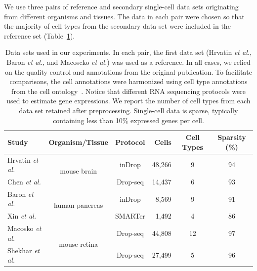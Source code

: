 \documentclass[runningheads]{llncs}
\newcommand{\etal}{\textit{et al.}}
\begin{document}
We use three pairs of reference and secondary single-cell data sets originating
from different organisms and tissues. The data in each pair were chosen so that
the majority of cell types from the secondary data set were included in the
reference set (Table~\ref{tab:datasets}).

\begin{table}[ht]
\begin{center}
\setlength\tabcolsep{4pt}
\begin{tabular}{l c c r c c}
\toprule
Study & Organism/Tissue & Protocol & Cells & Cell Types & Sparsity (\%) \\
\midrule
Hrvatin \etal & \multirow{2}{*}{mouse brain} & inDrop & 48,266 & 9 & 94 \\
Chen \etal & & Drop-seq & 14,437 & 6 & 93 \\[5pt]
Baron \etal & \multirow{2}{*}{human pancreas} & inDrop & 8,569 & 9 & 91 \\
Xin \etal & & SMARTer & 1,492 & 4 & 86 \\[5pt]
Macosko \etal & \multirow{2}{*}{mouse retina} & Drop-seq & 44,808 & 12 & 97 \\
Shekhar \etal & & Drop-seq & 27,499 & 5 & 96 \\
\bottomrule
\end{tabular}
\end{center}
\caption{Data sets used in our experiments. In each pair, the first data set
(Hrvatin \etal, Baron \etal, and Macoscko \etal) was used as a reference. In
all cases, we relied on the quality control and annotations from the original
publication. To facilitate comparisons, the cell annotations were harmonized using
cell type annotations from the cell ontology~\cite{cell_ontology}. Notice that
different RNA sequencing protocols were used to estimate gene expressions. We
report the number of cell types from each data set retained after
preprocessing. Single-cell data is sparse, typically containing less than 10\%
expressed genes per cell.}
\label{tab:datasets}
\end{table}
\end{document}
